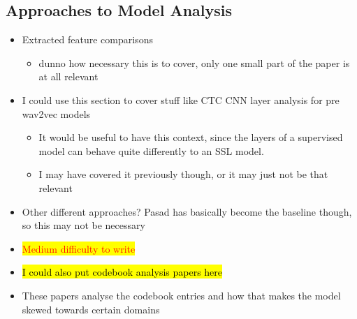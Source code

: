 \subsection{Approaches to Model Analysis}
\begin{itemize}
    \item Extracted feature comparisons \cite{li2023quantitative}
    \begin{itemize}
        \item dunno how necessary this is to cover, only one small part of the paper is at all relevant
    \end{itemize}
    \item I could use this section to cover stuff like CTC CNN layer analysis for pre wav2vec models
    \begin{itemize}
        \item It would be useful to have this context, since the layers of a supervised model can behave quite differently to an SSL model.
        \item I may have covered it previously though, or it may just not be that relevant
    \end{itemize}
    \item Other different approaches? Pasad has basically become the baseline though, so this may not be necessary
    \item \colorbox{yellow}{\textcolor{red}{Medium difficulty to write}}
    \item \hl{I could also put codebook analysis papers here }
    \item These papers analyse the codebook entries and how that makes the model skewed towards certain domains \cite{wang2025normalization, linke2023self, lee2024balanced}
\end{itemize}

